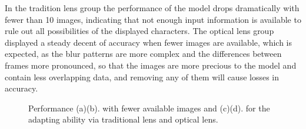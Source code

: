 In the tradition lens group the performance of the model drops dramatically with fewer than 10 images, indicating that not enough input information is available to rule out all possibilities of the displayed characters. The optical lens group displayed a steady decent of accuracy when fewer images are available, which is expected, as the blur patterns are more complex and the differences between frames more pronounced, so that the images are more precious to the model and contain less overlapping data, and removing any of them will cause losses in accuracy.
\begin{figure}[!t]
    \centering
    \hfill
    \caption{Performance (a)(b). with fewer available images and (c)(d). for the adapting ability via traditional lens and optical lens.}
    \label{fig:number_adapting}
\end{figure}


